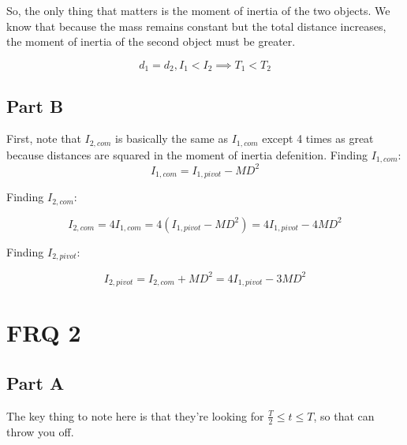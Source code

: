 \documentclass{article}
\begin{document}
So, the only thing that matters is the moment of inertia of the two objects. We know that because the mass remains constant but the total distance increases, the moment of inertia of the second object must be greater.

$$
d_1=d_2, I_1 < I_2 \implies T_1 < T_2
$$


\subsection{Part B}

First, note that $I_{2,com}$ is basically the same as $I_{1,com}$ except 4 times as great because distances are squared in the moment of inertia defenition. Finding $I_{1,com}$:
$$
I_{1,com} = I_{1,pivot} - MD^2
$$

Finding $I_{2,com}$:

$$
I_{2,com} = 4 I_{1,com} = 4(I_{1,pivot} - MD^2) = 4I_{1,pivot} - 4MD^2
$$

Finding $I_{2,pivot}$:

$$
I_{2,pivot} = I_{2,com} + MD^2 = 4I_{1,pivot} - 3MD^2
$$

\newpage
\section {FRQ 2}

\subsection {Part A}

The key thing to note here is that they're looking for $\frac{T}{2}\le t \le T$, so that can throw you off.

\vspace{0.4cm}
\end{document}
